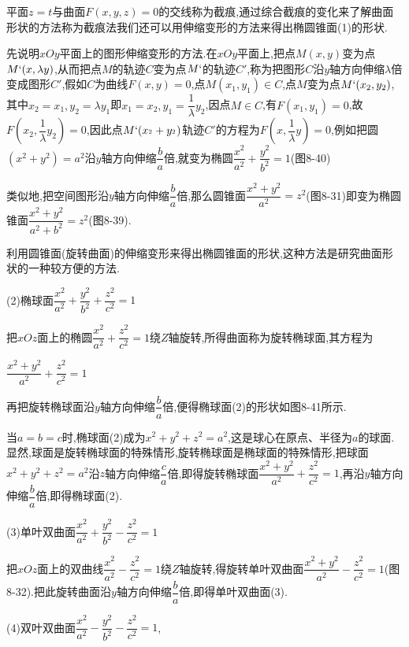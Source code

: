\documentclass[oneside]{book}
\begin{document}
平面$z=t$与曲面$F(x,y,z) = 0$的交线称为截痕,通过综合截痕的变化来了解曲面形状的方法称为截痕法我们还可以用伸缩变形的方法来得出椭圆锥面(1)的形状.

先说明$xOy$平面上的图形伸缩变形的方法.在$xOy$平面上,把点$M(x,y)$变为点$M`(x,\lambda y)$,从而把点$M$的轨迹$C$变为点$M`$的轨迹$C'$,称为把图形$C$沿$y$轴方向伸缩$\lambda $倍变成图形$C'$,假如$C$为曲线$F(x,y)=0$,点$M({x_1},{y_1}) \in C$,点$M$变为点$M`({x_2},{y_2})$,其中${x_2} = {x_1},{y_2} = \lambda {y_1}$即${x_1} = {x_2},{y_1} = \dfrac{1}{\lambda }{y_2}$,因点$M \in C$,有$F({x_1},{y_1}) = 0$,故$F\left( {{x_2},\dfrac{1}{\lambda }{y_2}} \right) = 0$,因此点$M`({x_{^2}} + {y_{^2}})$轨迹$C'$的方程为$F\left( {x,\dfrac{1}{\lambda }y} \right) = 0$,例如把圆$({x^2} + {y^2}) = {a^2}$沿$y$轴方向伸缩$\dfrac{b}{a}$倍,就变为椭圆$\dfrac{{{x^2}}}{{{a^2}}} + \dfrac{{{y^2}}}{{{b^2}}} = 1$(图8-40)

类似地,把空间图形沿$y$轴方向伸缩$\dfrac{b}{a}$倍,那么圆锥面$\dfrac{{{x^2} + {y^2}}}{{{a^2}}} = {z^2}$(图8-31)即变为椭圆锥面$\dfrac{{{x^2} + {y^2}}}{{{a^2} + {b^2}}} = {z^2}$(图8-39).

利用圆锥面(旋转曲面)的伸缩变形来得出椭圆锥面的形状,这种方法是研究曲面形状的一种较方便的方法.

(2)椭球面$\dfrac{{{x^2}}}{{{a^2}}} + \dfrac{{{y^2}}}{{{b^2}}} + \dfrac{{{z^2}}}{{{c^2}}} = 1$

把$xOz$面上的椭圆$\dfrac{{{x^2}}}{{{a^2}}} + \dfrac{{{z^2}}}{{{c^2}}} = 1$绕$Z$轴旋转,所得曲面称为旋转椭球面,其方程为

$\dfrac{{{x^2} + {y^2}}}{{{a^2}}} + \dfrac{{{z^2}}}{{{c^2}}} = 1$

再把旋转椭球面沿$y$轴方向伸缩$\dfrac{b}{a}$倍,便得椭球面(2)的形状如图8-41所示.

当$a=b=c$时,椭球面(2)成为${x^2} + {y^2} + {z^2} = {a^2}$,这是球心在原点、半径为$a$的球面.显然,球面是旋转椭球面的特殊情形,旋转椭球面是椭球面的特殊情形,把球面${x^2} + {y^2} + {z^2} = {a^2}$沿$z$轴方向伸缩$\dfrac{c}{a}$倍,即得旋转椭球面$\dfrac{{{x^2} + {y^2}}}{{{a^2}}} + \dfrac{{{z^2}}}{{{c^2}}} = 1$,再沿$y$轴方向伸缩$\dfrac{b}{a}$倍,即得椭球面(2).

(3)单叶双曲面$\dfrac{{{x^2}}}{{{a^2}}} + \dfrac{{{y^2}}}{{{b^2}}} - \dfrac{{{z^2}}}{{{c^2}}} = 1$

把$xOz$面上的双曲线$\dfrac{{{x^2}}}{{{a^2}}} - \dfrac{{{z^2}}}{{{c^2}}} = 1$绕$Z$轴旋转,得旋转单叶双曲面$\dfrac{{{x^2} + {y^2}}}{{{a^2}}} - \dfrac{{{z^2}}}{{{c^2}}} = 1$(图8-32).把此旋转曲面沿$y$轴方向伸缩$\dfrac{b}{a}$倍,即得单叶双曲面(3).

(4)双叶双曲面$\dfrac{{{x^2}}}{{{a^2}}} - \dfrac{{{y^2}}}{{{b^2}}} - \dfrac{{{z^2}}}{{{c^2}}} = 1$,
\end{document}
